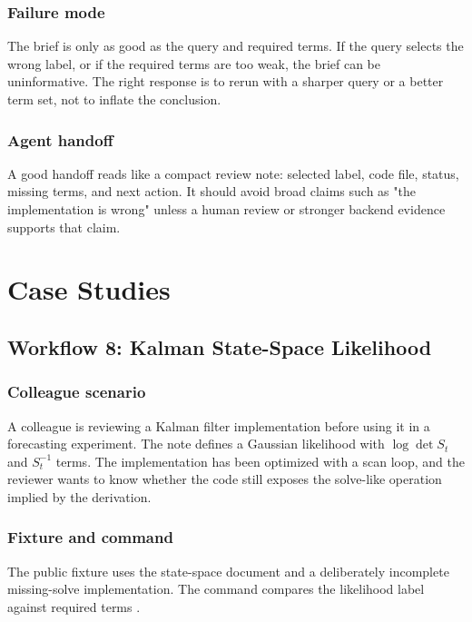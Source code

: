 \documentclass[12pt,a4paper,openany]{book}
\begin{document}
\section*{Failure mode}

The brief is only as good as the query and required terms. If the query selects
the wrong label, or if the required terms are too weak, the brief can be
uninformative. The right response is to rerun with a sharper query or a better
term set, not to inflate the conclusion.

\section*{Agent handoff}

A good handoff reads like a compact review note: selected label, code file,
status, missing terms, and next action. It should avoid broad claims such as
"the implementation is wrong" unless a human review or stronger backend evidence
supports that claim.

\part{Case Studies}

\chapter{Workflow 8: Kalman State-Space Likelihood}

\section*{Colleague scenario}

A colleague is reviewing a Kalman filter implementation before using it in a
forecasting experiment. The note defines a Gaussian likelihood with
\(\log\det S_t\) and \(S_t^{-1}\) terms. The implementation has been optimized
with a scan loop, and the reviewer wants to know whether the code still exposes
the solve-like operation implied by the derivation.

\section*{Fixture and command}

The public fixture uses the state-space document and a deliberately incomplete
missing-solve implementation. The command compares the likelihood label against
required terms .
\end{document}
